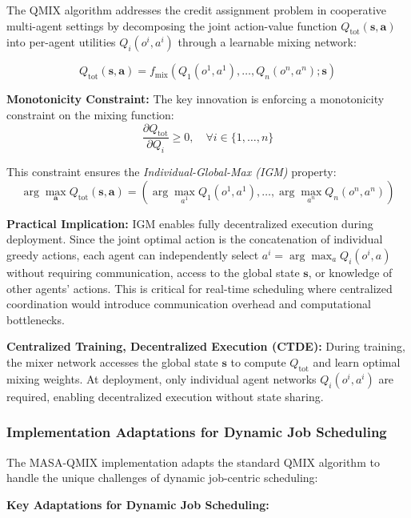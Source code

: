 The QMIX algorithm \citep{rashid2018qmix} addresses the credit assignment problem in cooperative multi-agent settings by decomposing the joint action-value function \(Q_{\text{tot}}(\mathbf{s}, \mathbf{a})\) into per-agent utilities \(Q_i(o^i, a^i)\) through a learnable mixing network:

\begin{equation}
Q_{\text{tot}}(\mathbf{s}, \mathbf{a}) = f_{\text{mix}}\left( Q_1(o^1, a^1), \ldots, Q_n(o^n, a^n); \mathbf{s} \right)
\end{equation}

\textbf{Monotonicity Constraint:} The key innovation is enforcing a monotonicity constraint on the mixing function:
\begin{equation}
\frac{\partial Q_{\text{tot}}}{\partial Q_i} \geq 0, \quad \forall i \in \{1, \ldots, n\}
\end{equation}

This constraint ensures the \textit{Individual-Global-Max (IGM)} property: 
\[
\arg\max_{\mathbf{a}} Q_{\text{tot}}(\mathbf{s}, \mathbf{a}) = \left( \arg\max_{a^1} Q_1(o^1, a^1), \ldots, \arg\max_{a^n} Q_n(o^n, a^n) \right)
\]

\textbf{Practical Implication:} IGM enables fully decentralized execution during deployment. Since the joint optimal action is the concatenation of individual greedy actions, each agent can independently select \(a^i = \arg\max_{a} Q_i(o^i, a)\) without requiring communication, access to the global state \(\mathbf{s}\), or knowledge of other agents' actions. This is critical for real-time scheduling where centralized coordination would introduce communication overhead and computational bottlenecks.

\textbf{Centralized Training, Decentralized Execution (CTDE):} During training, the mixer network accesses the global state \(\mathbf{s}\) to compute \(Q_{\text{tot}}\) and learn optimal mixing weights. At deployment, only individual agent networks \(Q_i(o^i, a^i)\) are required, enabling decentralized execution without state sharing.

\subsubsection{Implementation Adaptations for Dynamic Job Scheduling}

The MASA-QMIX implementation adapts the standard QMIX algorithm to handle the unique challenges of dynamic job-centric scheduling:

\textbf{Key Adaptations for Dynamic Job Scheduling:}

